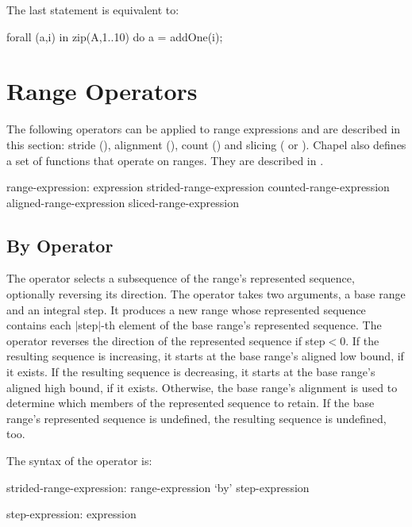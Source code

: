 The last statement is equivalent to:
\begin{chapel}
forall (a,i) in zip(A,1..10) do
  a = addOne(i);
\end{chapel}





\section{Range Operators}
\label{Range_Operators}

The following operators can be applied to range
expressions and are described in this section: stride (),
alignment (), count (\chpl{\#}) and slicing (\chpl{\(\)}
or \chpl{\[\]}).
Chapel also defines a set of functions that operate on ranges.
They are described in .

\begin{syntax}
range-expression:
  expression
  strided-range-expression
  counted-range-expression
  aligned-range-expression
  sliced-range-expression
\end{syntax}

\subsection{By Operator}
\label{By_Operator_For_Ranges}

The  operator selects a subsequence of the range's represented sequence,
optionally reversing its direction.
The operator takes two arguments, a base range and an integral step.
It produces a new range whose represented sequence contains
each $|$step$|$-th element of the base range's represented sequence.
The operator reverses the direction of the represented sequence if step$<$0.
If the resulting sequence is increasing,
it starts at the base range's aligned low bound, if it exists.
If the resulting sequence is decreasing,
it starts at the base range's aligned high bound, if it exists.
%
Otherwise, the base range's alignment is used to determine
which members of the represented sequence to retain.
%
If the base range's represented sequence is undefined,
the resulting sequence is undefined, too.

The syntax of the  operator is:
\begin{syntax}
strided-range-expression:
  range-expression `by' step-expression

step-expression:
  expression
\end{syntax}

